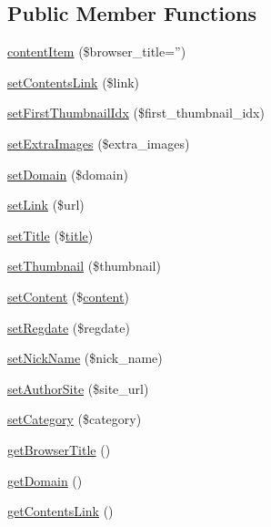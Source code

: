 \subsection*{Public Member Functions}
\begin{DoxyCompactItemize}
\item 
\hyperlink{classcontentItem_a6d43634cb803585fa2a0feb13f63fad4}{content\+Item} (\$browser\+\_\+title='')
\item 
\hyperlink{classcontentItem_afe78ae4ab14d74305c86d27570d9a7f8}{set\+Contents\+Link} (\$link)
\item 
\hyperlink{classcontentItem_ab18307a6068a6cdde94369976fe730f4}{set\+First\+Thumbnail\+Idx} (\$first\+\_\+thumbnail\+\_\+idx)
\item 
\hyperlink{classcontentItem_a8f635dff719c18bf5e969b13ca901c74}{set\+Extra\+Images} (\$extra\+\_\+images)
\item 
\hyperlink{classcontentItem_a61b6be878a0183cd1c3dfde8f29d5c20}{set\+Domain} (\$domain)
\item 
\hyperlink{classcontentItem_aad5f15eead8728ad5e2636740c4ff145}{set\+Link} (\$url)
\item 
\hyperlink{classcontentItem_a5a29426d7878c413cd6d63e930ce0a0f}{set\+Title} (\$\hyperlink{ko_8install_8php_a5b072c5fd1d2228c6ba5cee13cd142e3}{title})
\item 
\hyperlink{classcontentItem_a0145a758535658fa776871bfd675be15}{set\+Thumbnail} (\$thumbnail)
\item 
\hyperlink{classcontentItem_ad7355ad724398f4fbc79832241767405}{set\+Content} (\$\hyperlink{classcontent}{content})
\item 
\hyperlink{classcontentItem_abb2dad632dd405213708d5c211518c82}{set\+Regdate} (\$regdate)
\item 
\hyperlink{classcontentItem_ae3175aa0291e75bf95cb1220e50a33e4}{set\+Nick\+Name} (\$nick\+\_\+name)
\item 
\hyperlink{classcontentItem_af28f4f40f1ac95cee2d88fe1e7d4b683}{set\+Author\+Site} (\$site\+\_\+url)
\item 
\hyperlink{classcontentItem_aa8ba578ae6629d632a42a76da823c59f}{set\+Category} (\$category)
\item 
\hyperlink{classcontentItem_a1590559deb019ba22a637cf78408f242}{get\+Browser\+Title} ()
\item 
\hyperlink{classcontentItem_a7a513d119938877566418029c6124a45}{get\+Domain} ()
\item 
\hyperlink{classcontentItem_a80a161de842f1a890fdbfee439674881}{get\+Contents\+Link} ()

\end{DoxyCompactItemize}
